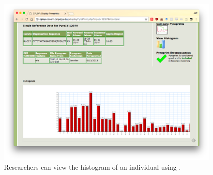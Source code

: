 \begin{figure}
    \centering
    \includegraphics[width=\frontendwidth]{figures/frontend/pyroprint-histogram}
    \caption{Researchers can view the histogram of an individual \pyro{} using \cplop{}.}
    \label{fig:pyroprint-histogram}
\end{figure}